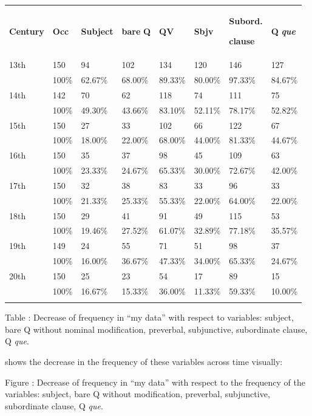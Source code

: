 \documentclass[output=paper]{langscibook}
\begin{document}
\begin{tabularx}{\textwidth}{XXXXXXXX}

\lsptoprule

 \textbf{Century} & \textbf{Occ} & \textbf{Subject} & \textbf{bare} \textbf{Q} & \textbf{QV} & \textbf{Sbjv} & { \textbf{Subord.}}

 \textbf{clause} & \textbf{Q} \textbf{\textit{que}}\\
 13th & 150 & 94 & 102 & 134 & 120 & 146 & 127\\
& 100\% & 62.67\% & 68.00\% & 89.33\% & 80.00\% & 97.33\% & 84.67\%\\
 14th & 142 & 70 & 62 & 118 & 74 & 111 & 75\\
& 100\% & 49.30\% & 43.66\% & 83.10\% & 52.11\% & 78.17\% & 52.82\%\\
 15th & 150 & 27 & 33 & 102 & 66 & 122 & 67\\
& 100\% & 18.00\% & 22.00\% & 68.00\% & 44.00\% & 81.33\% & 44.67\%\\
 16th & 150 & 35 & 37 & 98 & 45 & 109 & 63\\
& 100\% & 23.33\% & 24.67\% & 65.33\% & 30.00\% & 72.67\% & 42.00\%\\
 17th & 150 & 32 & 38 & 83 & 33 & 96 & 33\\
& 100\% & 21.33\% & 25.33\% & 55.33\% & 22.00\% & 64.00\% & 22.00\%\\
 18th & 150 & 29 & 41 & 91 & 49 & 115 & 53\\
& 100\% & 19.46\% & 27.52\% & 61.07\% & 32.89\% & 77.18\% & 35.57\%\\
 19th & 149 & 24 & 55 & 71 & 51 & 98 & 37\\
& 100\% & 16.00\% & 36.67\% & 47.33\% & 34.00\% & 65.33\% & 24.67\%\\
 20th & 150 & 25 & 23 & 54 & 17 & 89 & 15\\
& 100\% & 16.67\% & 15.33\% & 36.00\% & 11.33\% & 59.33\% & 10.00\%\\
\lspbottomrule
\end{tabularx}
Table : Decrease of frequency in “my data” with respect to variables: subject, bare Q without nominal modification, preverbal, subjunctive, subordinate clause, Q \textit{que}.

 shows the decrease in the frequency of these variables across time visually:

Figure : Decrease of frequency in “my data” with respect to the frequency of the variables: subject, bare Q without modification, preverbal, subjunctive, subordinate clause, Q \textit{que}.
\end{document}

